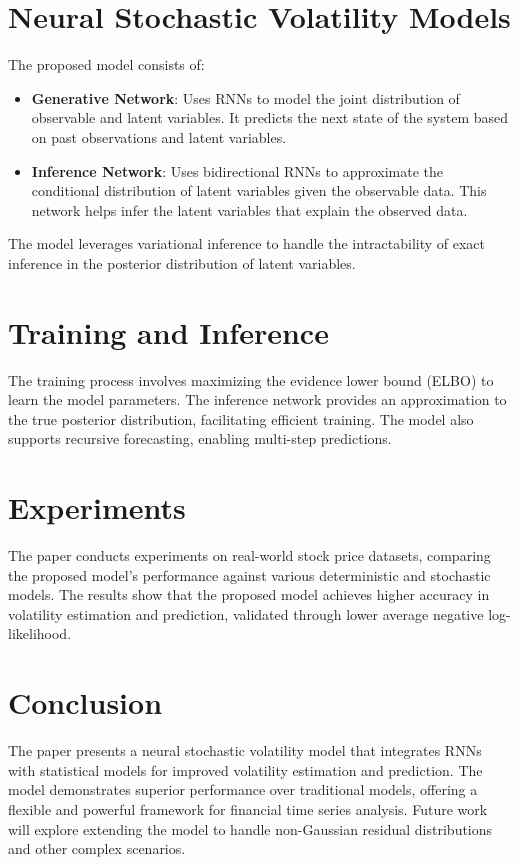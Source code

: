 \documentclass[letterpaper, 11pt]{article}
\begin{document}
\section{Neural Stochastic Volatility Models}
The proposed model consists of:
\begin{itemize}
    \item \textbf{Generative Network}: Uses RNNs to model the joint distribution of observable and latent variables. It predicts the next state of the system based on past observations and latent variables.
    \item \textbf{Inference Network}: Uses bidirectional RNNs to approximate the conditional distribution of latent variables given the observable data. This network helps infer the latent variables that explain the observed data.
\end{itemize}
The model leverages variational inference to handle the intractability of exact inference in the posterior distribution of latent variables.

\section{Training and Inference}
The training process involves maximizing the evidence lower bound (ELBO) to learn the model parameters. The inference network provides an approximation to the true posterior distribution, facilitating efficient training. The model also supports recursive forecasting, enabling multi-step predictions.

\section{Experiments}
The paper conducts experiments on real-world stock price datasets, comparing the proposed model's performance against various deterministic and stochastic models. The results show that the proposed model achieves higher accuracy in volatility estimation and prediction, validated through lower average negative log-likelihood.

\section{Conclusion}
The paper presents a neural stochastic volatility model that integrates RNNs with statistical models for improved volatility estimation and prediction. The model demonstrates superior performance over traditional models, offering a flexible and powerful framework for financial time series analysis. Future work will explore extending the model to handle non-Gaussian residual distributions and other complex scenarios.
\end{document}
